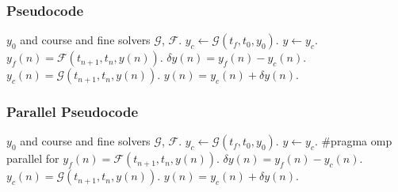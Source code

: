 \documentclass[pdf,12pt]{beamer}
\newcommand{\course}{\mathcal{G}}
\newcommand{\fine}{\mathcal{F}}
\begin{document}
\begin{frame}
  \frametitle{Pseudocode}
  \begin{algorithmic}
    \Require $y_0$ and course and fine solvers $\course$, $\fine$.
    \State $y_c \gets \course(t_f, t_0, y_0)$.
    \State $y \gets y_c$.
        \State $y_f(n) = \fine(t_{n+1},t_n,y(n))$.
        \State $\delta y(n) = y_f(n) - y_c(n)$.
      \EndFor
        \State $y_c(n) = \course(t_{n+1},t_n,y(n))$.
        \State $y(n) = y_c(n) + \delta y(n)$.
      \EndFor
    \EndWhile
  \end{algorithmic}
\end{frame}

\begin{frame}
  \frametitle{Parallel Pseudocode}
  \begin{algorithmic}
    \Require $y_0$ and course and fine solvers $\course$, $\fine$.
    \State $y_c \gets \course(t_f, t_0, y_0)$.
    \State $y \gets y_c$.
      \State \#pragma omp parallel for
        \State $y_f(n) = \fine(t_{n+1},t_n,y(n))$.
        \State $\delta y(n) = y_f(n) - y_c(n)$.
      \EndFor
        \State $y_c(n) = \course(t_{n+1},t_n,y(n))$.
        \State $y(n) = y_c(n) + \delta y(n)$.
      \EndFor
    \EndWhile
  \end{algorithmic}
\end{frame}
\end{document}
